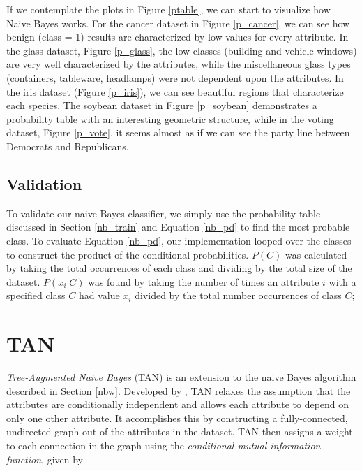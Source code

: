 \documentclass{article}
\begin{document}
		If we contemplate the plots in Figure \ref{ptable}, we can start to visualize how Naive Bayes works. 
		For the cancer dataset in Figure \ref{p_cancer}, we can see how benign (class = 1) results are characterized by low values for every attribute. 
		In the glass dataset, Figure \ref{p_glass}, the low classes (building and vehicle windows) are very well characterized by the attributes, while the miscellaneous glass types (containers, tableware, headlamps) were not dependent upon the attributes. 
		In the iris dataset (Figure \ref{p_iris}), we can see beautiful regions that characterize each species. 
		The soybean dataset in Figure \ref{p_soybean} demonstrates a probability table with an interesting geometric structure, while in the voting dataset, Figure \ref{p_vote}, it seems almost as if we can see the party line between Democrats and Republicans.
		

		
	\subsection{Validation}
		
		To validate our naive Bayes classifier, we simply use the probability table discussed in Section \ref{nb_train} and Equation \ref{nb_pd} to find the most probable class. To evaluate Equation \ref{nb_pd}, our implementation looped over the classes to construct the product of the conditional probabilities. $P(C)$ was calculated by taking the total occurrences of each class and dividing by the total size of the dataset. $P(x_i | C)$ was found by taking the number of times an attribute $i$ with a specified class $C$ had value $x_i$  divided by the total number occurrences of class $C$;
		
\section{TAN}

		\textit{Tree-Augmented Naive Bayes} (TAN) is an extension to the naive Bayes algorithm described in Section \ref{nbw}. 
		Developed by \cite{Friedman1997}, TAN relaxes the assumption that the attributes are conditionally independent and allows each attribute to depend on only one other attribute. 
		It accomplishes this by constructing a fully-connected, undirected graph out of the attributes in the dataset. 
		TAN then assigns a weight to each connection in the graph using the \textit{conditional mutual information function}, given by
		
\end{document}
